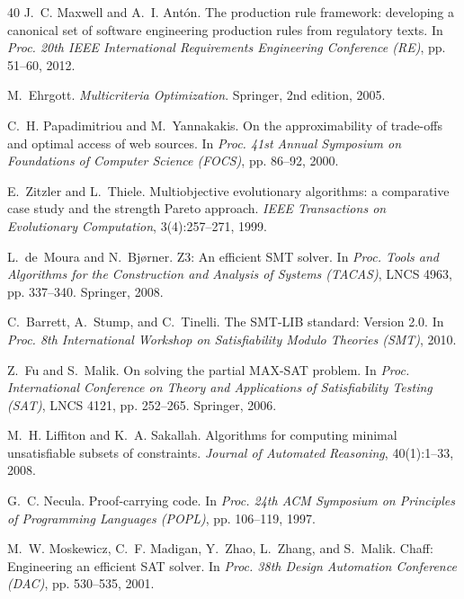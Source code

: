 \documentclass[11pt,twocolumn]{article}
\begin{document}
\begin{thebibliography}{40}
J.~C. Maxwell and A.~I. Ant{\'o}n.
\newblock The production rule framework: developing a canonical set of software
  engineering production rules from regulatory texts.
\newblock In \emph{Proc. 20th IEEE International Requirements Engineering
  Conference (RE)}, pp. 51--60, 2012.

M.~Ehrgott.
\newblock \emph{Multicriteria Optimization}.
\newblock Springer, 2nd edition, 2005.

C.~H. Papadimitriou and M.~Yannakakis.
\newblock On the approximability of trade-offs and optimal access of web
  sources.
\newblock In \emph{Proc. 41st Annual Symposium on Foundations of Computer
  Science (FOCS)}, pp. 86--92, 2000.

E.~Zitzler and L.~Thiele.
\newblock Multiobjective evolutionary algorithms: a comparative case study and
  the strength Pareto approach.
\newblock \emph{IEEE Transactions on Evolutionary Computation}, 3(4):257--271,
  1999.

L.~de~Moura and N.~Bj{\o}rner.
\newblock Z3: An efficient SMT solver.
\newblock In \emph{Proc. Tools and Algorithms for the Construction and Analysis
  of Systems (TACAS)}, LNCS 4963, pp. 337--340. Springer, 2008.

C.~Barrett, A.~Stump, and C.~Tinelli.
\newblock The SMT-LIB standard: Version 2.0.
\newblock In \emph{Proc. 8th International Workshop on Satisfiability Modulo
  Theories (SMT)}, 2010.

Z.~Fu and S.~Malik.
\newblock On solving the partial MAX-SAT problem.
\newblock In \emph{Proc. International Conference on Theory and Applications of
  Satisfiability Testing (SAT)}, LNCS 4121, pp. 252--265. Springer, 2006.

M.~H. Liffiton and K.~A. Sakallah.
\newblock Algorithms for computing minimal unsatisfiable subsets of constraints.
\newblock \emph{Journal of Automated Reasoning}, 40(1):1--33, 2008.

G.~C. Necula.
\newblock Proof-carrying code.
\newblock In \emph{Proc. 24th ACM Symposium on Principles of Programming
  Languages (POPL)}, pp. 106--119, 1997.

M.~W. Moskewicz, C.~F. Madigan, Y.~Zhao, L.~Zhang, and S.~Malik.
\newblock Chaff: Engineering an efficient SAT solver.
\newblock In \emph{Proc. 38th Design Automation Conference (DAC)},
  pp. 530--535, 2001.


\end{thebibliography}
\end{document}
